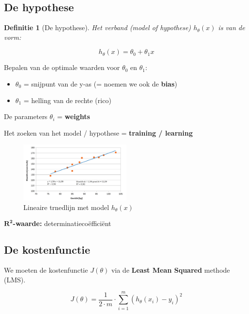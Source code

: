 \documentclass{article}
\newtheorem{theorem}{Definitie}[section]
\begin{document}
\subsection{De hypothese}

\begin{theorem}[De hypothese]
Het verband (model of hypothese) $h_{\theta}(x)$ is van de vorm:

\begin{equation}
h_{\theta}(x) = \theta_0 + \theta_1x
\end{equation}
\end{theorem}

Bepalen van de optimale waarden voor $\theta_0$ en $\theta_1$:

\begin{itemize}
    \item $\theta_0$ = snijpunt van de y-as (= noemen we ook de \textbf{bias})
    \item $\theta_1$ = helling van de rechte (rico)
\end{itemize}

De parameters $\theta_i$ = \textbf{weights}

Het zoeken van het model / hypothese = \textbf{training / learning}

\begin{figure}[H]
    \centering
    \includegraphics[width=0.5\textwidth]{lineaire-regressie-hypothese.png}
    \caption{Lineaire trnedlijn met model $h_{\theta}(x)$}
\end{figure}

$\mathbf{R^2}$\textbf{-waarde:} determinatiecoëfficiënt

\subsection{De kostenfunctie}

We moeten de kostenfunctie $J(\theta)$ via de \textbf{Least Mean Squared} methode (LMS). 

\begin{equation}
J(\theta) = \frac{1}{2\cdot m} \cdot \sum_{i=1}^m (h_{\theta}(x_i) - y_i)^2
\end{equation}
\end{document}
